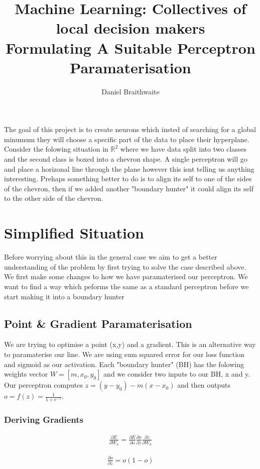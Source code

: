 \documentclass{article}
\title{%
	Machine Learning: Collectives of local decision makers\\
	\large Formulating A Suitable Perceptron Paramaterisation
}
\author{Daniel Braithwaite}
\begin{document}
\maketitle

The goal of this project is to create neurons which insted of searching for a global minumum they will choose a specific part of the data to place their hyperplane. Consider the folowing situation in $\mathbb{R}^2$ where we have data split into two classes and the second class is boxed into a chevron shape. A single perceptron will go and place a horizonal line through the plane however this isnt telling us anything interesting. Prehaps something better to do is to align its self to one of the sides of the chevron, then if we added another "boundary hunter" it could align its self to the other side of the chevron.

\section{Simplified Situation}
Before worrying about this in the general case we aim to get a better understanding of the problem by first trying to solve the case described above. We first make some changes to how we have paramaterised our perceptron. We want to find a way which peforms the same as a standard perceptron before we start making it into a boundary hunter

\subsection{Point \& Gradient Paramaterisation}
We are trying to optimise a point (x,y) and a gradient. This is an alternative way to paramaterise our line. We are using sum squared error for our loss function and sigmoid as our activation. Each "boundary hunter" (BH) has the folowing weights vector $W = [m, x_0, y_0]$ and we consider two inputs to our BH, x and y. Our perceptron computes $z = (y - y_0) - m(x - x_0)$ and then outputs $o = f(z) = \frac{1}{1+e^{-z}}$.

\subsubsection{Deriving Gradients}
\begin{align}
\frac{\partial E}{\partial W_a} = \frac{\partial E}{\partial o} \frac{\partial o}{\partial z} \frac{\partial z}{\partial W_a}
\end{align}

\begin{align}
\frac{\partial o}{\partial z} = o(1 - o)
\end{align}
\end{document}
